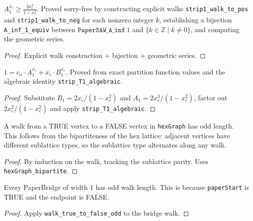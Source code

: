 \begin{lemma}
\begin{lemma}[$A_{\inf}$ for $T = 1$: lower bound]\label{lem:A_inf_1_ge}
\leanok
{}
  $A_1^{x_c} \geq \frac{2x_c^3}{1 - x_c^2}$.
  Proved sorry-free by constructing explicit walks
  \texttt{strip1\_walk\_to\_pos} and \texttt{strip1\_walk\_to\_neg}
  for each nonzero integer $k$, establishing a bijection
  \texttt{A\_inf\_1\_equiv} between $\texttt{PaperSAW\_A\_inf}~1$ and
  $\{k \in \mathbb{Z} \mid k \neq 0\}$, and computing the geometric series.
\end{lemma}
\begin{proof}\leanok Explicit walk construction + bijection + geometric series. \end{proof}

\begin{theorem}[Infinite strip identity for $T = 1$]\label{thm:strip_T1_identity}
\leanok
{}
  $1 = c_\alpha \cdot A_1^{x_c} + x_c \cdot B_1^{x_c}$.
  Proved from exact partition function values and the algebraic identity
  \texttt{strip\_T1\_algebraic}.
\end{theorem}
\begin{proof}\leanok
  Substitute $B_1 = 2x_c/(1-x_c^2)$ and $A_1 = 2x_c^3/(1-x_c^2)$,
  factor out $2x_c^2/(1-x_c^2)$ and apply \texttt{strip\_T1\_algebraic}.
\end{proof}

\begin{lemma}\label{lem:walk_bipartite}
\leanok
{}
  A walk from a TRUE vertex to a FALSE vertex in \texttt{hexGraph}
  has odd length. This follows from the bipartiteness of the hex lattice:
  adjacent vertices have different sublattice types, so the sublattice type
  alternates along any walk.
\end{lemma}
\begin{proof}\leanok
  By induction on the walk, tracking the sublattice parity.
  Uses \texttt{hexGraph\_bipartite}.
\end{proof}

\begin{lemma}\label{lem:bridge1_odd}
\leanok
{}
  Every PaperBridge of width $1$ has odd walk length.
  This is because \texttt{paperStart} is TRUE and the endpoint is FALSE.
\end{lemma}
\begin{proof}\leanok
  Apply \texttt{walk\_true\_to\_false\_odd} to the bridge walk.
\end{proof}


\end{lemma}
